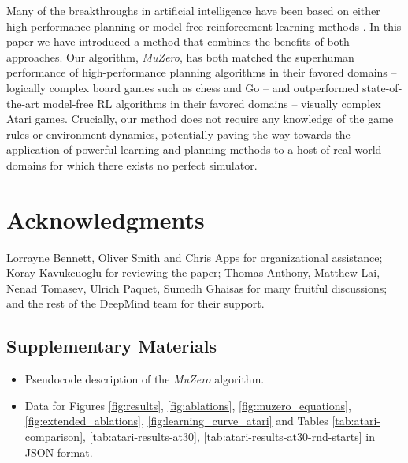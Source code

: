 \documentclass{article}
\newcommand{\muzero}{\emph{MuZero}}
\begin{document}
Many of the breakthroughs in artificial intelligence have been based on either high-performance planning \cite{campbell:deep-blue, Silver16AG, Silver18AZ} or model-free reinforcement learning methods \cite{dqn, openai_dota, alphastar}. In this paper we have introduced a method that combines the benefits of both approaches. Our algorithm, \muzero{}, has both matched the superhuman performance of high-performance planning algorithms in their favored domains -- logically complex board games such as chess and Go -- and outperformed state-of-the-art model-free RL algorithms in their favored domains -- visually complex Atari games. Crucially, our method does not require any knowledge of the game rules or environment dynamics, potentially paving the way towards the application of powerful learning and planning methods to a host of real-world domains for which there exists no perfect simulator.

\section{Acknowledgments}

Lorrayne Bennett, Oliver Smith and Chris Apps for organizational assistance; Koray Kavukcuoglu for reviewing the paper; Thomas Anthony, Matthew Lai, Nenad Tomasev, Ulrich Paquet, Sumedh Ghaisas for many fruitful discussions; and the rest of the DeepMind team for their support.

%
%

%

%

%
%
%

%
%




\setcounter{table}{0}
\renewcommand{\thetable}{S\arabic{table}}%
\setcounter{figure}{0}
\renewcommand{\thefigure}{S\arabic{figure}}%

\subsection*{Supplementary Materials}

\begin{itemize}
\item Pseudocode description of the \muzero{} algorithm.
\item Data for Figures \ref{fig:results}, \ref{fig:ablations}, \ref{fig:muzero_equations}, \ref{fig:extended_ablations}, \ref{fig:learning_curve_atari} and Tables \ref{tab:atari-comparison}, \ref{tab:atari-results-at30}, \ref{tab:atari-results-at30-rnd-starts} in JSON format.
\end{itemize}
\end{document}
